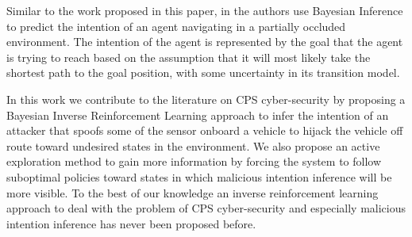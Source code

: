 \documentclass[letterpaper, 10 pt, conference]{ieeeconf}  %
\begin{document}

Similar to the work proposed in this paper, in \cite{Best2015} the authors use Bayesian Inference to predict the intention of an agent navigating in a partially occluded environment. The intention of the agent is represented by the goal that the agent is trying to reach based on the assumption that it will most likely take the shortest path to the goal position, with some uncertainty in its transition model.

In this work we contribute to the literature on CPS cyber-security by proposing a Bayesian Inverse Reinforcement Learning approach to infer the intention of an attacker that spoofs some of the sensor onboard a vehicle to hijack the vehicle off route toward undesired states in the environment. We also propose an active exploration method to gain more information by forcing the system to follow suboptimal policies toward states in which malicious intention inference will be more visible.
To the best of our knowledge an inverse reinforcement learning approach to deal with the problem of CPS cyber-security and especially malicious intention inference has never been proposed before.
%
\end{document}
